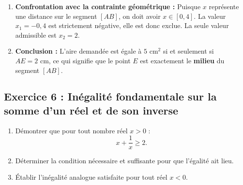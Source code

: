 \documentclass[11pt,a4paper]{article}
\begin{document}
\begin{correctionbox}
\begin{enumerate}
    \item \textbf{Confrontation avec la contrainte géométrique :}
    Puisque $x$ représente une distance sur le segment $[AB]$, on doit avoir $x \in [0, 4]$.
    La valeur $x_1 = -0{,}4$ est strictement négative, elle est donc exclue.
    La seule valeur admissible est $x_2 = 2$.

    \item \textbf{Conclusion :}
    L'aire demandée est égale à $5\text{ cm}^2$ si et seulement si $AE = 2\text{ cm}$, ce qui signifie que le point $E$ est exactement le \textbf{milieu} du segment $[AB]$.
\end{enumerate}
\end{correctionbox}

\subsection*{Exercice 6 : Inégalité fondamentale sur la somme d'un réel et de son inverse}
\begin{enumerate}
    \item Démontrer que pour tout nombre réel $x > 0$ :
    \[
    x + \frac{1}{x} \ge 2.
    \]
    \item Déterminer la condition nécessaire et suffisante pour que l'égalité ait lieu.
    \item Établir l'inégalité analogue satisfaite pour tout réel $x < 0$.
\end{enumerate}
\end{document}
